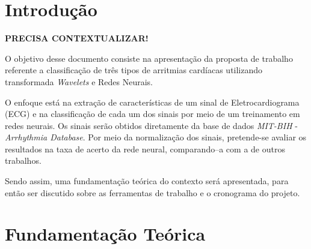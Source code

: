 \documentclass[conference]{IEEEtran}
\begin{document}




\maketitle






%
\IEEEpeerreviewmaketitle



\section{Introdução}
\textbf{PRECISA CONTEXTUALIZAR!}


O objetivo desse documento consiste na apresentação da proposta de trabalho referente a classificação de três tipos de arritmias cardíacas utilizando transformada \textit{Wavelets} e Redes Neurais.

O enfoque está na extração de características de um sinal de Eletrocardiograma (ECG) e na classificação de cada um dos sinais por meio de um treinamento em redes neurais. Os sinais serão obtidos diretamente da base de dados \textit{MIT-BIH} - \textit{Arrhythmia Database}. Por meio da normalização dos sinais, pretende-se avaliar os resultados na taxa de acerto da rede neural, comparando–a com a de outros trabalhos.

Sendo assim, uma fundamentação teórica do contexto será apresentada, para então ser discutido sobre as ferramentas de trabalho e o cronograma do projeto.

 

\section{Fundamentação Teórica}
\end{document}
